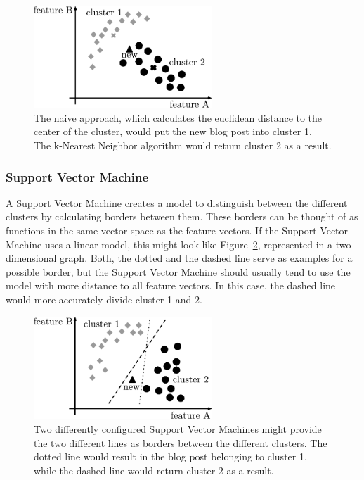 \begin{figure}[h]
    \centering
    \includegraphics[width=0.6\textwidth]{images/naive.pdf}
    \caption{The naive approach, which calculates the euclidean distance to the center of the cluster, would put the new blog post into cluster 1. The k-Nearest Neighbor algorithm would return cluster 2 as a result.}
    \label{fig:naive}
\end{figure}


\subsubsection{Support Vector Machine}
\label{sec:support_vector_machine}


A Support Vector Machine creates a model to distinguish between the different clusters by calculating borders between them.
These borders can be thought of as functions in the same vector space as the feature vectors.
If the Support Vector Machine uses a linear model, this might look like Figure~\ref{fig:svm}, represented in a two-dimensional graph.
Both, the dotted and the dashed line serve as examples for a possible border, but the Support Vector Machine should usually tend to use the model with more distance to all feature vectors.
In this case, the dashed line would more accurately divide cluster 1 and 2.


\begin{figure}[h]
    \centering
    \includegraphics[width=0.6\textwidth]{images/svm.pdf}
    \caption{Two differently configured Support Vector Machines might provide the two different lines as borders between the different clusters. The dotted line would result in the blog post belonging to cluster 1, while the dashed line would return cluster 2 as a result.}
    \label{fig:svm}
\end{figure}
